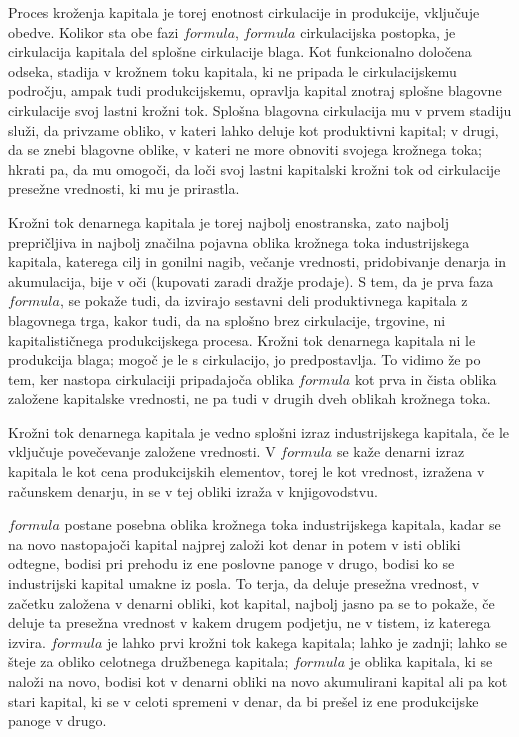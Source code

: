 \documentclass[a5paper]{scrbook}
\begin{document}
Proces kroženja kapitala je torej enotnost cirkulacije in produkcije, vključuje obedve. Kolikor sta obe fazi \( formula \), \( formula \) cirkulacijska postopka, je cirkulacija kapitala del splošne cirkulacije blaga. Kot funkcionalno določena odseka, stadija v krožnem toku kapitala, ki ne pripada le cirkulacijskemu področju, ampak tudi produkcijskemu, opravlja kapital znotraj splošne blagovne cirkulacije svoj lastni krožni tok. Splošna blagovna cirkulacija mu v prvem stadiju služi, da privzame obliko, v kateri lahko deluje kot produktivni kapital; v drugi, da se znebi blagovne oblike, v kateri ne more obnoviti svojega krožnega toka; hkrati pa, da mu omogoči, da loči svoj lastni kapitalski krožni tok od cirkulacije presežne vrednosti, ki mu je prirastla.

Krožni tok denarnega kapitala je torej najbolj enostranska, zato najbolj prepričljiva in najbolj značilna pojavna oblika krožnega toka industrijskega kapitala, katerega cilj in gonilni nagib, večanje vrednosti, pridobivanje denarja in akumulacija, bije v oči (kupovati zaradi dražje prodaje). S tem, da je prva faza \( formula \), se pokaže tudi, da izvirajo sestavni deli produktivnega kapitala z blagovnega trga, kakor tudi, da na splošno brez cirkulacije, trgovine, ni kapitalističnega produkcijskega procesa. Krožni tok denarnega kapitala ni le produkcija blaga; mogoč je le s cirkulacijo, jo predpostavlja. To vidimo že po tem, ker nastopa cirkulaciji pripadajoča oblika \( formula \) kot prva in čista oblika založene kapitalske vrednosti, ne pa tudi v drugih dveh oblikah krožnega toka.

Krožni tok denarnega kapitala je vedno splošni izraz industrijskega kapitala, če le vključuje povečevanje založene vrednosti. V \( formula \) se kaže denarni izraz kapitala le kot cena produkcijskih elementov, torej le kot vrednost, izražena v računskem denarju, in se v tej obliki izraža v knjigovodstvu.

\( formula \) postane posebna oblika krožnega toka industrijskega kapitala, kadar se na novo nastopajoči kapital najprej založi kot denar in potem v isti obliki odtegne, bodisi pri prehodu iz ene poslovne panoge v drugo, bodisi ko se industrijski kapital umakne iz posla. To terja, da deluje presežna vrednost, v začetku založena v denarni obliki, kot kapital, najbolj jasno pa se to pokaže, če deluje ta presežna vrednost v kakem drugem podjetju, ne v tistem, iz katerega izvira. \( formula \) je lahko prvi krožni tok kakega kapitala; lahko je zadnji; lahko se šteje za obliko celotnega družbenega kapitala; \( formula \) je oblika kapitala, ki se naloži na novo, bodisi kot v denarni obliki na novo akumulirani kapital ali pa kot stari kapital, ki se v celoti spremeni v denar, da bi prešel iz ene produkcijske panoge v drugo.
\end{document}
